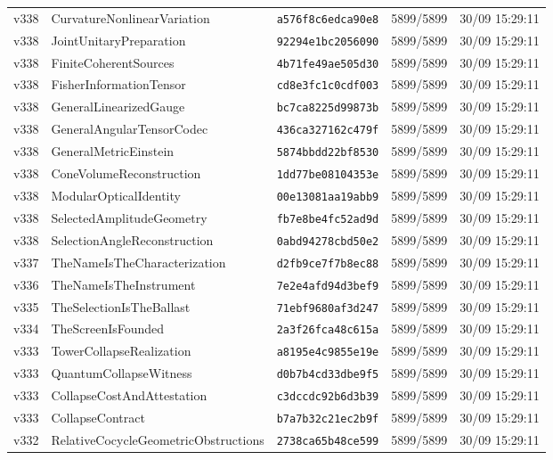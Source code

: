\documentclass[11pt]{article}
\theoremstyle{definition}\newtheorem{deriv}{Derivação}
\begin{document}
{\begin{longtable}{@{}lllll@{}}
v338 & CurvatureNonlinearVariation & \texttt{a576f8c6edca90e8} & 5899/5899 & 30/09 15:29:11 \\
v338 & JointUnitaryPreparation & \texttt{92294e1bc2056090} & 5899/5899 & 30/09 15:29:11 \\
v338 & FiniteCoherentSources & \texttt{4b71fe49ae505d30} & 5899/5899 & 30/09 15:29:11 \\
v338 & FisherInformationTensor & \texttt{cd8e3fc1c0cdf003} & 5899/5899 & 30/09 15:29:11 \\
v338 & GeneralLinearizedGauge & \texttt{bc7ca8225d99873b} & 5899/5899 & 30/09 15:29:11 \\
v338 & GeneralAngularTensorCodec & \texttt{436ca327162c479f} & 5899/5899 & 30/09 15:29:11 \\
v338 & GeneralMetricEinstein & \texttt{5874bbdd22bf8530} & 5899/5899 & 30/09 15:29:11 \\
v338 & ConeVolumeReconstruction & \texttt{1dd77be08104353e} & 5899/5899 & 30/09 15:29:11 \\
v338 & ModularOpticalIdentity & \texttt{00e13081aa19abb9} & 5899/5899 & 30/09 15:29:11 \\
v338 & SelectedAmplitudeGeometry & \texttt{fb7e8be4fc52ad9d} & 5899/5899 & 30/09 15:29:11 \\
v338 & SelectionAngleReconstruction & \texttt{0abd94278cbd50e2} & 5899/5899 & 30/09 15:29:11 \\
v337 & TheNameIsTheCharacterization & \texttt{d2fb9ce7f7b8ec88} & 5899/5899 & 30/09 15:29:11 \\
v336 & TheNameIsTheInstrument & \texttt{7e2e4afd94d3bef9} & 5899/5899 & 30/09 15:29:11 \\
v335 & TheSelectionIsTheBallast & \texttt{71ebf9680af3d247} & 5899/5899 & 30/09 15:29:11 \\
v334 & TheScreenIsFounded & \texttt{2a3f26fca48c615a} & 5899/5899 & 30/09 15:29:11 \\
v333 & TowerCollapseRealization & \texttt{a8195e4c9855e19e} & 5899/5899 & 30/09 15:29:11 \\
v333 & QuantumCollapseWitness & \texttt{d0b7b4cd33dbe9f5} & 5899/5899 & 30/09 15:29:11 \\
v333 & CollapseCostAndAttestation & \texttt{c3dccdc92b6d3b39} & 5899/5899 & 30/09 15:29:11 \\
v333 & CollapseContract & \texttt{b7a7b32c21ec2b9f} & 5899/5899 & 30/09 15:29:11 \\
v332 & RelativeCocycleGeometricObstructions & \texttt{2738ca65b48ce599} & 5899/5899 & 30/09 15:29:11 \\

\end{longtable}}
\end{document}
